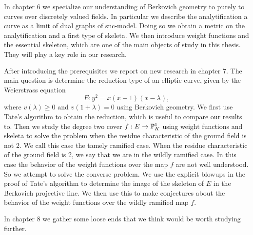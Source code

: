 In chapter 6 we specialize our understanding of Berkovich geometry to purely to curves over discretely valued fields. 
In particular we describe the analytification a curve as a limit of dual graphs of snc-model. 
Doing so we obtain a metric on the analytification and a first type of skeleta.
We then introduce weight functions and the essential skeleton, which are one of the main objects of study in this thesis. 
They will play a key role in our research.  

\medskip


After introducing the prerequisites we report on new research in chapter 7. 
The main question is determine the reduction type of an elliptic curve, given by the Weierstrass equation \[
	E: y^2 = x(x-1)(x-\lambda)
,\] 
where $v(\lambda) \ge 0$ and $v(1 + \lambda) = 0$ using Berkovich geometry.
We first use Tate's algorithm to obtain the reduction, which is useful to compare our results to. 
Then we study the degree two cover $f: E \to \mathbb{P}^{1}_K$ using weight functions and skeleta to solve the problem when the residue characteristic of the ground field is not 2.
We call this case the tamely ramified case. 
When the residue characteristic of the ground field is 2, we say that we are in the wildly ramified case. 
In this case the behavior of the weight functions over the map $f$ are not well understood. 
So we attempt to solve the converse problem. 
We use the explicit blowups in the proof of Tate's algorithm to determine the image of the skeleton of $E$ in the Berkovich projective line.
We then use this to make conjectures about the behavior of the weight functions over the wildly ramified map $f$. 

In chapter 8 we gather some loose ends that we think would be worth studying further. 



